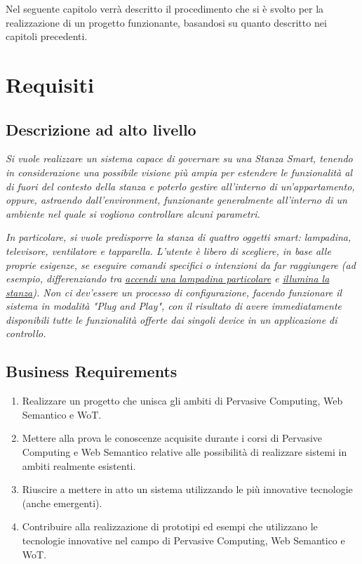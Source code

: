 \documentclass[12pt,a4paper,openright,oneside]{report}
\begin{document}
Nel seguente capitolo verrà descritto il procedimento che si è svolto per la realizzazione di un progetto funzionante, basandosi su quanto descritto nei capitoli precedenti.

\section{Requisiti}

\subsection{Descrizione ad alto livello}
\textsl{Si vuole realizzare un sistema capace di governare su una Stanza Smart, tenendo in considerazione una possibile visione più ampia per estendere le funzionalità al di fuori del contesto della stanza e poterlo gestire all'interno di un'appartamento, oppure, astraendo dall'environment, funzionante generalmente all'interno di un ambiente nel quale si vogliono controllare alcuni parametri.\\}

\textsl{In particolare, si vuole predisporre la stanza di quattro oggetti smart: lampadina, televisore, ventilatore e tapparella. L'utente è libero di scegliere, in base alle proprie esigenze, se eseguire comandi specifici o intenzioni da far raggiungere (ad esempio, differenziando tra \ul{accendi una lampadina particolare} e \ul{illumina la stanza}). Non ci dev'essere un processo di configurazione, facendo funzionare il sistema in modalità "Plug and Play", con il risultato di avere immediatamente disponibili tutte le funzionalità offerte dai singoli device in un applicazione di controllo.}

\subsection{Business Requirements}
\begin{enumerate}
	\item Realizzare un progetto che unisca gli ambiti di Pervasive Computing, Web Semantico e WoT.
	
	\item Mettere alla prova le conoscenze acquisite durante i corsi di Pervasive Computing e Web Semantico relative alle possibilità di realizzare sistemi in ambiti realmente esistenti.
	
	\item Riuscire a mettere in atto un sistema utilizzando le più innovative tecnologie (anche emergenti).
	
	\item Contribuire alla realizzazione di prototipi ed esempi che utilizzano le tecnologie innovative nel campo di Pervasive Computing, Web Semantico e WoT.
\end{enumerate}
\end{document}
